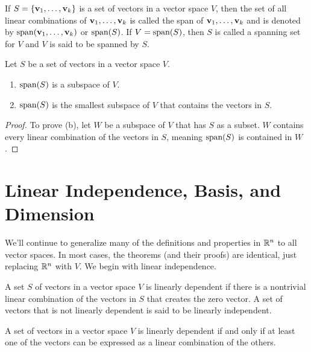 \documentclass[../m073main.tex]{subfiles}
\begin{document}
\begin{definition}[Span]
	If $S = \{\mathbf{v}_1, \ldots, \mathbf{v}_{k}\}$ is a set of vectors in a vector space $V$, then the set of all linear combinations of $\mathbf{v}_1, \ldots, \mathbf{v}_k$ is called the span of $\mathbf{v}_1, \ldots, \mathbf{v}_k$ and is denoted by $\textrm{span}(\mathbf{v}_1, \ldots, \mathbf{v}_k)$ or $\textrm{span}(S)$.
	If $V = \textrm{span}(S)$, then $S$ is called a spanning set for $V$ and $V$ is said to be spanned by $S$.
\end{definition}

\begin{theorem}
	Let $S$ be a set of vectors in a vector space $V$.
	\begin{enumerate}[label=(\alph*),topsep=0pt]
		\item $\textrm{span}(S)$ is a subspace of $V$.
		\item $\textrm{span}(S)$ is the smallest subspace of $V$ that contains the vectors in $S$.
	\end{enumerate}
\end{theorem}

\begin{proof}
	To prove (b), let $W$ be a subspace of $V$ that has $S$ as a subset.
	$W$ contains every linear combination of the vectors in $S$, meaning $\textrm{span}(S)$ is contained in $W$.
\end{proof}


\section{Linear Independence, Basis, and Dimension}
We'll continue to generalize many of the definitions and properties in $\mathbb{R}^n$ to all vector spaces.
In most cases, the theorems (and their proofs) are identical, just replacing $\mathbb{R}^n$ with $V$.
We begin with linear independence.

\begin{definition}
	A set $S$ of vectors in a vector space $V$ is linearly dependent if there is a nontrivial linear combination of the vectors in $S$ that creates the zero vector.
	A set of vectors that is not linearly dependent is said to be linearly independent.
\end{definition}

\begin{theorem}
	A set of vectors in a vector space $V$ is linearly dependent if and only if at least one of the vectors can be expressed as a linear combination of the others.
\end{theorem}
\end{document}
